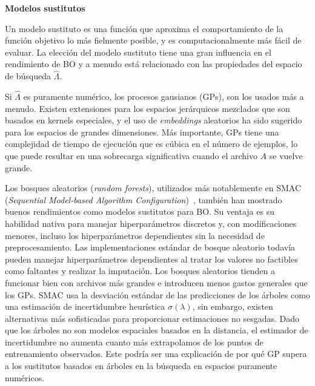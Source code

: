 \quad

\textbf{Modelos sustitutos}

\quad

Un modelo sustituto es una función que aproxima el comportamiento de la función objetivo lo más fielmente posible, y es computacionalmente más fácil de evaluar. La elección del modelo sustituto tiene una gran influencia en el rendimiento de BO y a menudo está relacionado con las propiedades del espacio de búsqueda $\hat{\varLambda}$. 

Si $\hat{\varLambda}$ es puramente numérico, los procesos gausianos (GPs), son los usados más a menudo. Existen extensiones para los espacios jerárquicos mezclados que son basados en kernels especiales, y el uso de \emph{embeddings} aleatorios ha sido sugerido para los espacios de grandes dimensiones. Más importante, GPs tiene una complejidad de tiempo de ejecución que es cúbica en el número de ejemplos, lo que puede resultar en una sobrecarga significativa cuando el archivo $A$ se vuelve grande.

Los bosques aleatorios (\emph{random forests}), utilizados más notablemente en SMAC (\emph{Sequential Model-based Algorithm Configuration})~\cite{hutter2011SequentialMO}, también han mostrado buenos rendimientos como modelos sustitutos para BO. Su ventaja es su habilidad nativa para manejar hiperparámetros discretos y, con modificaciones menores, incluso los hiperparámetros dependientes sin la necesidad de preprocesamiento. Las implementaciones estándar de bosque aleatorio todavía pueden manejar hiperparámetros dependientes al tratar los valores no factibles como faltantes y realizar la imputación. Los bosques aleatorios tienden a funcionar bien con archivos más grandes e introducen menos gastos generales que los GPs. SMAC usa la desviación estándar de las predicciones de los árboles como una estimación de incertidumbre heurística $\hat{\sigma}(\lambda)$,  sin embargo, existen alternativas más sofisticadas para proporcionar estimaciones no sesgadas. Dado que los árboles no son modelos espaciales basados en la distancia, el estimador de incertidumbre no aumenta cuanto más extrapolamos de los puntos de entrenamiento observados. Este podría ser una explicación de por qué GP supera a los sustitutos basados en árboles en la búsqueda en espacios puramente numéricos.


